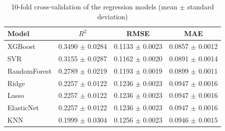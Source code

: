 \begin{table}
\caption{10-fold cross-validation of the regression models (mean $\pm$ standard deviation)}
\label{tab:cv_regression}
\begin{tabular}{lccc}
\toprule
Model & $R^2$ & RMSE & MAE \\
\midrule
XGBoost & 0.3490 $\pm$ 0.0284 & 0.1133 $\pm$ 0.0023 & 0.0857 $\pm$ 0.0012 \\
SVR & 0.3155 $\pm$ 0.0287 & 0.1162 $\pm$ 0.0020 & 0.0891 $\pm$ 0.0014 \\
RandomForest & 0.2789 $\pm$ 0.0219 & 0.1193 $\pm$ 0.0019 & 0.0899 $\pm$ 0.0011 \\
Ridge & 0.2257 $\pm$ 0.0122 & 0.1236 $\pm$ 0.0023 & 0.0947 $\pm$ 0.0016 \\
Lasso & 0.2257 $\pm$ 0.0122 & 0.1236 $\pm$ 0.0023 & 0.0947 $\pm$ 0.0016 \\
ElasticNet & 0.2257 $\pm$ 0.0122 & 0.1236 $\pm$ 0.0023 & 0.0947 $\pm$ 0.0016 \\
KNN & 0.1999 $\pm$ 0.0304 & 0.1256 $\pm$ 0.0023 & 0.0946 $\pm$ 0.0015 \\
\bottomrule
\end{tabular}
\end{table}

